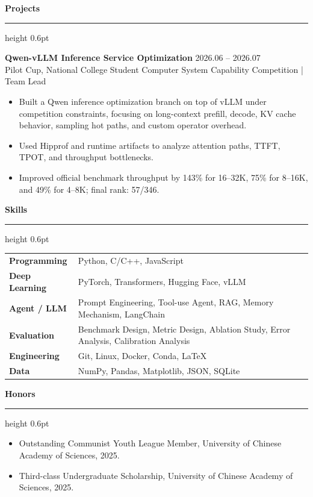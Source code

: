 \documentclass[10pt,a4paper]{ctexart}
\newcommand{\resumeSection}[1]{%
    \vspace{9pt}
    {\large\bfseries\color{accent} #1}
    \vspace{2pt}
    \hrule height 0.6pt
    \vspace{5pt}
}
\newcommand{\resumeProjectHeading}[3]{%
    \textbf{#1} \hfill {\small #3}\\
    {\small #2}
    \vspace{2pt}
}
\newcommand{\resumeItem}[1]{\item #1}
\begin{document}
\resumeSection{Projects}
\resumeProjectHeading{Qwen-vLLM Inference Service Optimization}{Pilot Cup, National College Student Computer System Capability Competition \quad | \quad Team Lead}{2026.06 -- 2026.07}
\begin{itemize}
    \resumeItem{Built a Qwen inference optimization branch on top of vLLM under competition constraints, focusing on long-context prefill, decode, KV cache behavior, sampling hot paths, and custom operator overhead.}
    \resumeItem{Used Hipprof and runtime artifacts to analyze attention paths, TTFT, TPOT, and throughput bottlenecks.}
    \resumeItem{Improved official benchmark throughput by 143\% for 16--32K, 75\% for 8--16K, and 49\% for 4--8K; final rank: 57/346.}
\end{itemize}

\resumeSection{Skills}
\begin{tabularx}{\textwidth}{@{}>{\bfseries}l@{\quad}X@{}}
    Programming & Python, C/C++, JavaScript \\
    Deep Learning & PyTorch, Transformers, Hugging Face, vLLM \\
    Agent / LLM & Prompt Engineering, Tool-use Agent, RAG, Memory Mechanism, LangChain \\
    Evaluation & Benchmark Design, Metric Design, Ablation Study, Error Analysis, Calibration Analysis \\
    Engineering & Git, Linux, Docker, Conda, LaTeX \\
    Data & NumPy, Pandas, Matplotlib, JSON, SQLite \\
\end{tabularx}

\resumeSection{Honors}
\begin{itemize}
    \resumeItem{Outstanding Communist Youth League Member, University of Chinese Academy of Sciences, 2025.}
    \resumeItem{Third-class Undergraduate Scholarship, University of Chinese Academy of Sciences, 2025.}
\end{itemize}
\end{document}
